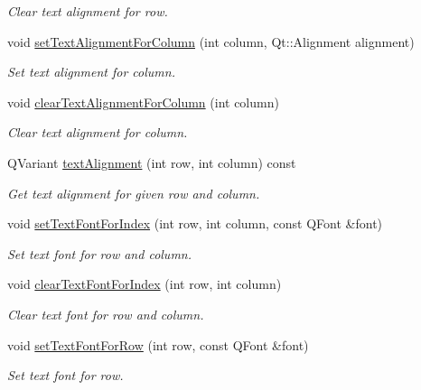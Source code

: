 \begin{DoxyCompactItemize}
\begin{DoxyCompactList}\small\item\em Clear text alignment for row. \end{DoxyCompactList}\item 
void \hyperlink{class_mdt_1_1_item_model_1_1_format_proxy_model_afdfade12b8d6e52dc853840440efb79c}{set\+Text\+Alignment\+For\+Column} (int column, Qt\+::\+Alignment alignment)
\begin{DoxyCompactList}\small\item\em Set text alignment for column. \end{DoxyCompactList}\item 
void \hyperlink{class_mdt_1_1_item_model_1_1_format_proxy_model_a2e1c69a65575440232874023a6168436}{clear\+Text\+Alignment\+For\+Column} (int column)
\begin{DoxyCompactList}\small\item\em Clear text alignment for column. \end{DoxyCompactList}\item 
Q\+Variant \hyperlink{class_mdt_1_1_item_model_1_1_format_proxy_model_a171b4821249bc8431ed17cf630831c10}{text\+Alignment} (int row, int column) const 
\begin{DoxyCompactList}\small\item\em Get text alignment for given row and column. \end{DoxyCompactList}\item 
void \hyperlink{class_mdt_1_1_item_model_1_1_format_proxy_model_aaec530e440f32e44c65c85dd628aa461}{set\+Text\+Font\+For\+Index} (int row, int column, const Q\+Font \&font)
\begin{DoxyCompactList}\small\item\em Set text font for row and column. \end{DoxyCompactList}\item 
void \hyperlink{class_mdt_1_1_item_model_1_1_format_proxy_model_a0adbb91cc6a1578fc6a4c04e3600036b}{clear\+Text\+Font\+For\+Index} (int row, int column)
\begin{DoxyCompactList}\small\item\em Clear text font for row and column. \end{DoxyCompactList}\item 
void \hyperlink{class_mdt_1_1_item_model_1_1_format_proxy_model_ab17dd3206e25c907369138eb8946a6bb}{set\+Text\+Font\+For\+Row} (int row, const Q\+Font \&font)
\begin{DoxyCompactList}\small\item\em Set text font for row. \end{DoxyCompactList}\item 

\end{DoxyCompactItemize}

